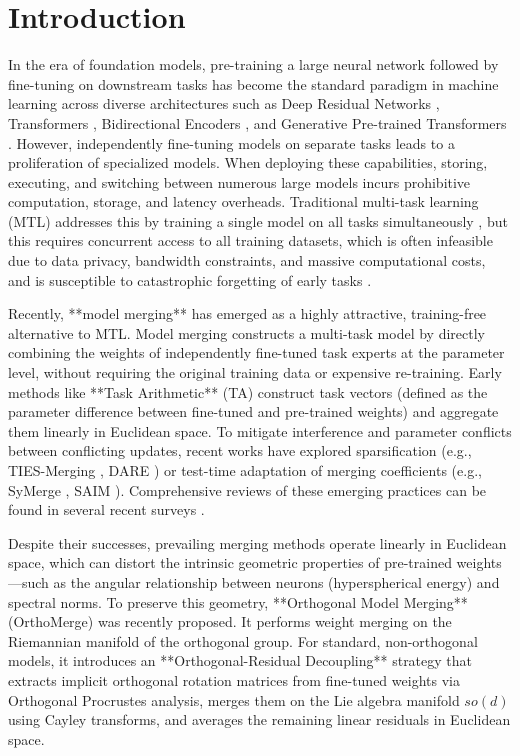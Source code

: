 \documentclass{article}
\theoremstyle{plain}
\theoremstyle{definition}
\theoremstyle{remark}
\begin{document}
\section{Introduction}
\label{sec:intro}

In the era of foundation models, pre-training a large neural network followed by fine-tuning on downstream tasks has become the standard paradigm in machine learning across diverse architectures such as Deep Residual Networks \cite{he2016deep}, Transformers \cite{vaswani2017attention}, Bidirectional Encoders \cite{devlin2018bert}, and Generative Pre-trained Transformers \cite{radford2019language,touvron2023llama}. However, independently fine-tuning models on separate tasks leads to a proliferation of specialized models. When deploying these capabilities, storing, executing, and switching between numerous large models incurs prohibitive computation, storage, and latency overheads. Traditional multi-task learning (MTL) addresses this by training a single model on all tasks simultaneously \cite{langley00}, but this requires concurrent access to all training datasets, which is often infeasible due to data privacy, bandwidth constraints, and massive computational costs, and is susceptible to catastrophic forgetting of early tasks \cite{kirkpatrick2017overcoming}.

Recently, **model merging** has emerged as a highly attractive, training-free alternative to MTL. Model merging constructs a multi-task model by directly combining the weights of independently fine-tuned task experts at the parameter level, without requiring the original training data or expensive re-training. Early methods like **Task Arithmetic** (TA) \cite{ilharco2022editing,ortiz2024task} construct task vectors (defined as the parameter difference between fine-tuned and pre-trained weights) and aggregate them linearly in Euclidean space. To mitigate interference and parameter conflicts between conflicting updates, recent works have explored sparsification (e.g., TIES-Merging \cite{yadav2023ties}, DARE \cite{yu2024dare}) or test-time adaptation of merging coefficients (e.g., SyMerge \cite{jung2025symerge}, SAIM \cite{anonymous2026saim}). Comprehensive reviews of these emerging practices can be found in several recent surveys \cite{song2024model,wolfe2024model}.

Despite their successes, prevailing merging methods operate linearly in Euclidean space, which can distort the intrinsic geometric properties of pre-trained weights—such as the angular relationship between neurons (hyperspherical energy) and spectral norms. To preserve this geometry, **Orthogonal Model Merging** (OrthoMerge) \cite{yang2026orthogonal} was recently proposed. It performs weight merging on the Riemannian manifold of the orthogonal group. For standard, non-orthogonal models, it introduces an **Orthogonal-Residual Decoupling** strategy that extracts implicit orthogonal rotation matrices from fine-tuned weights via Orthogonal Procrustes analysis, merges them on the Lie algebra manifold $so(d)$ using Cayley transforms, and averages the remaining linear residuals in Euclidean space.
\end{document}
